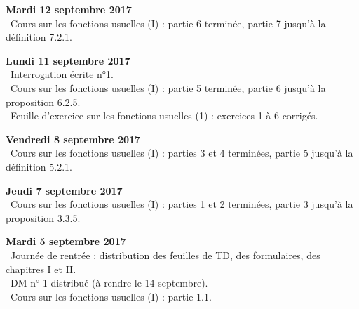 \documentclass[12pt,a4paper]{article}
\begin{document}
\noindent\textbf{Mardi 12 septembre 2017}\\
\bu\ Cours sur les fonctions usuelles (I) : partie 6 terminée, partie 7 jusqu'à la définition 7.2.1. \\
\vspace{.4cm}

\noindent\textbf{Lundi 11 septembre 2017}\\
\bu\ Interrogation écrite n°1. \\
\bu\ Cours sur les fonctions usuelles (I) : partie 5 terminée, partie 6 jusqu'à la proposition 6.2.5. \\
\bu\ Feuille d'exercice sur les fonctions usuelles (1) : exercices 1 à 6 corrigés. \\
\vspace{.4cm}

\noindent\textbf{Vendredi 8 septembre 2017}\\
\bu\ Cours sur les fonctions usuelles (I) : parties 3 et 4 terminées, partie 5 jusqu'à la définition 5.2.1. \\
\vspace{.4cm}

\noindent\textbf{Jeudi 7 septembre 2017}\\
\bu\ Cours sur les fonctions usuelles (I) : parties 1 et 2 terminées, partie 3 jusqu'à la proposition 3.3.5. \\
\vspace{.4cm}

\noindent\textbf{Mardi 5 septembre 2017}\\
\bu\ Journée de rentrée ; distribution des feuilles de TD, des formulaires, des
chapitres I et II.  \\
\bu\ DM n° 1 distribué (à rendre le 14 septembre). \\
\bu\ Cours sur les fonctions usuelles (I) : partie 1.1. \\
\vspace{.4cm}


\label{end}
\end{document}
